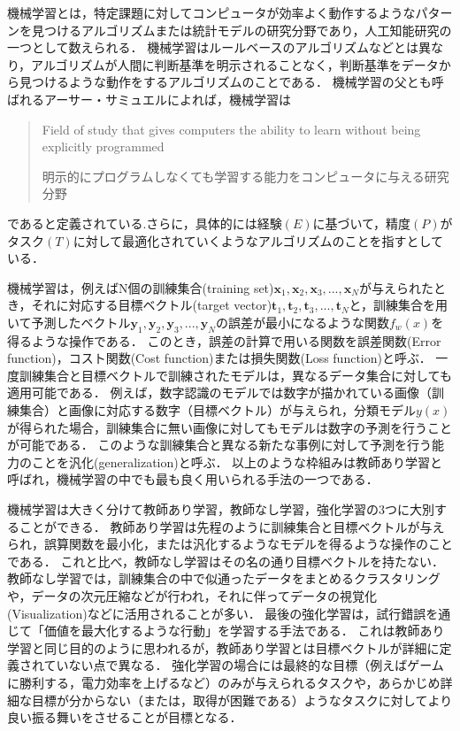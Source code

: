     機械学習とは，特定課題に対してコンピュータが効率よく動作するようなパターンを見つけるアルゴリズムまたは統計モデルの研究分野であり，人工知能研究の一つとして数えられる．
    機械学習はルールベースのアルゴリズムなどとは異なり，アルゴリズムが人間に判断基準を明示されることなく，判断基準をデータから見つけるような動作をするアルゴリズムのことである．
    機械学習の父とも呼ばれるアーサー・サミュエルによれば，機械学習は
    \begin{quote}
        Field of study that gives computers the ability to learn without being explicitly programmed
        
        明示的にプログラムしなくても学習する能力をコンピュータに与える研究分野
    \end{quote}
    であると定義されている\cite{samuel1959some}.さらに，具体的には経験$(E)$に基づいて，精度$(P)$がタスク$(T)$に対して最適化されていくようなアルゴリズムのことを指すとしている．
    
    機械学習は，例えばN個の訓練集合(training set)${\bm{x}_1, \bm{x}_2, \bm{x}_3, ... , \bm{x}_N}$が与えられたとき，それに対応する目標ベクトル(target vector)${\bm{t}_1, \bm{t}_2, \bm{t}_3, ... , \bm{t}_N}$と，訓練集合を用いて予測したベクトル${\bm{y}_1, \bm{y}_2, \bm{y}_3, ... , \bm{y}_N}$の誤差が最小になるような関数$f_w(x)$を得るような操作である．
    このとき，誤差の計算で用いる関数を誤差関数(Error function)，コスト関数(Cost function)または損失関数(Loss function)と呼ぶ．
    一度訓練集合と目標ベクトルで訓練されたモデルは，異なるデータ集合に対しても適用可能である．
    例えば，数字認識のモデルでは数字が描かれている画像（訓練集合）と画像に対応する数字（目標ベクトル）が与えられ，分類モデル$y(x)$が得られた場合，訓練集合に無い画像に対してもモデルは数字の予測を行うことが可能である．
    このような訓練集合と異なる新たな事例に対して予測を行う能力のことを汎化(generalization)と呼ぶ．
    以上のような枠組みは教師あり学習と呼ばれ，機械学習の中でも最も良く用いられる手法の一つである．
    
    機械学習は大きく分けて教師あり学習，教師なし学習，強化学習の3つに大別することができる．
    教師あり学習は先程のように訓練集合と目標ベクトルが与えられ，誤算関数を最小化，または汎化するようなモデルを得るような操作のことである．
    これと比べ，教師なし学習はその名の通り目標ベクトルを持たない．
    教師なし学習では，訓練集合の中で似通ったデータをまとめるクラスタリングや，データの次元圧縮などが行われ，それに伴ってデータの視覚化(Visualization)などに活用されることが多い．
    最後の強化学習は，試行錯誤を通じて「価値を最大化するような行動」を学習する手法である．
    これは教師あり学習と同じ目的のように思われるが，教師あり学習とは目標ベクトルが詳細に定義されていない点で異なる．
    強化学習の場合には最終的な目標（例えばゲームに勝利する，電力効率を上げるなど）のみが与えられるタスクや，あらかじめ詳細な目標が分からない（または，取得が困難である）ようなタスクに対してより良い振る舞いをさせることが目標となる．
    
